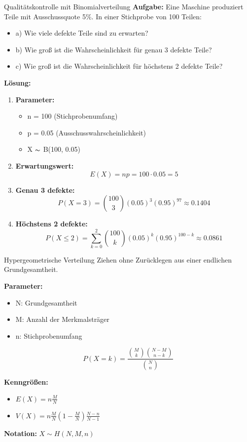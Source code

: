 \begin{example}{Qualitätskontrolle mit Binomialverteilung}
\textbf{Aufgabe:} Eine Maschine produziert Teile mit Ausschussquote 5\%. In einer Stichprobe von 100 Teilen:
\begin{itemize}
\item a) Wie viele defekte Teile sind zu erwarten?
\item b) Wie groß ist die Wahrscheinlichkeit für genau 3 defekte Teile?
\item c) Wie groß ist die Wahrscheinlichkeit für höchstens 2 defekte Teile?
\end{itemize}

\textbf{Lösung:}
\begin{enumerate}
\item \textbf{Parameter:}
   \begin{itemize}
   \item n = 100 (Stichprobenumfang)
   \item p = 0.05 (Ausschusswahrscheinlichkeit)
   \item X $\thicksim$ B(100, 0.05)
   \end{itemize}

\item \textbf{Erwartungswert:}
   $$E(X) = np = 100 \cdot 0.05 = 5$$

\item \textbf{Genau 3 defekte:}
   $$P(X=3) = \binom{100}{3}(0.05)^3(0.95)^{97} \approx 0.1404$$

\item \textbf{Höchstens 2 defekte:}
   $$P(X \leq 2) = \sum_{k=0}^2 \binom{100}{k}(0.05)^k(0.95)^{100-k} \approx 0.0861$$
\end{enumerate}
\end{example}

\begin{definition}{Hypergeometrische Verteilung}
Ziehen ohne Zurücklegen aus einer endlichen Grundgesamtheit.

\textbf{Parameter:}
\begin{itemize}
    \item N: Grundgesamtheit
    \item M: Anzahl der Merkmalsträger
    \item n: Stichprobenumfang
\end{itemize}

$$P(X=k) = \frac{\binom{M}{k}\binom{N-M}{n-k}}{\binom{N}{n}}$$

\textbf{Kenngrößen:}
\begin{itemize}
    \item $E(X) = n\frac{M}{N}$
    \item $V(X) = n\frac{M}{N}(1-\frac{M}{N})\frac{N-n}{N-1}$
\end{itemize}

\textbf{Notation:} $X \sim H(N,M,n)$
\end{definition}

